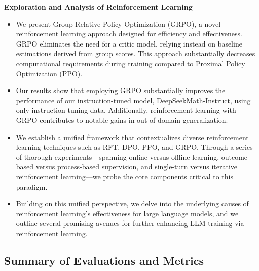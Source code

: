 \textbf{Exploration and Analysis of Reinforcement Learning}

\begin{itemize}[topsep=0pt]
    \item We present Group Relative Policy Optimization (GRPO), a novel reinforcement learning approach designed for efficiency and effectiveness. GRPO eliminates the need for a critic model, relying instead on baseline estimations derived from group scores. This approach substantially decreases computational requirements during training compared to Proximal Policy Optimization (PPO).
    \item Our results show that employing GRPO substantially improves the performance of our instruction-tuned model, DeepSeekMath-Instruct, using only instruction-tuning data. Additionally, reinforcement learning with GRPO contributes to notable gains in out-of-domain generalization.
    \item We establish a unified framework that contextualizes diverse reinforcement learning techniques such as RFT, DPO, PPO, and GRPO. Through a series of thorough experiments—spanning online versus offline learning, outcome-based versus process-based supervision, and single-turn versus iterative reinforcement learning—we probe the core components critical to this paradigm.
    \item Building on this unified perspective, we delve into the underlying causes of reinforcement learning's effectiveness for large language models, and we outline several promising avenues for further enhancing LLM training via reinforcement learning.
\end{itemize}

\subsection{Summary of Evaluations and Metrics}

